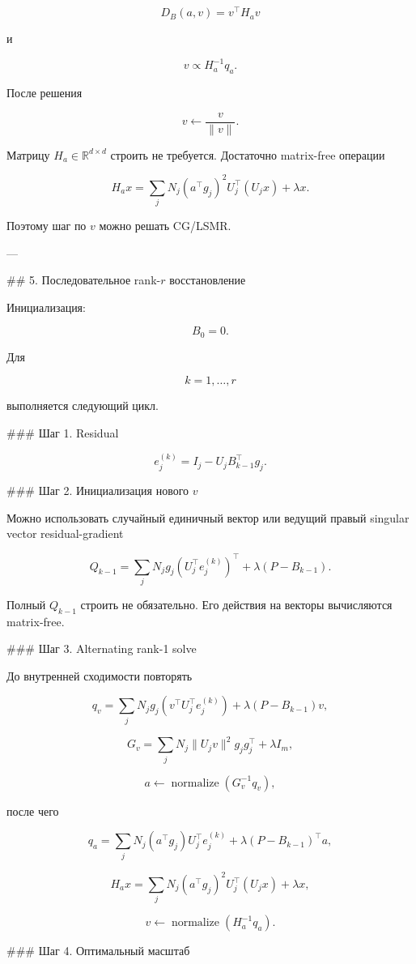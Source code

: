 \[
D_B(a,v)=v^\top H_av
\]

и

\[
\boxed{
v
\propto
H_a^{-1}q_a.
}
\]

После решения

\[
v\leftarrow\frac{v}{\|v\|}.
\]

Матрицу \(H_a\in\mathbb R^{d\times d}\) строить не требуется. Достаточно matrix-free операции

\[
H_ax
=
\sum_j
N_j
(a^\top g_j)^2
U_j^\top(U_jx)
+
\lambda x.
\]

Поэтому шаг по \(v\) можно решать CG/LSMR.

---

## 5. Последовательное rank-\(r\) восстановление

Инициализация:

\[
B_0=0.
\]

Для

\[
k=1,\ldots,r
\]

выполняется следующий цикл.

### Шаг 1. Residual

\[
e_j^{(k)}
=
I_j-U_jB_{k-1}^\top g_j.
\]

### Шаг 2. Инициализация нового \(v\)

Можно использовать случайный единичный вектор или ведущий правый singular vector residual-gradient

\[
Q_{k-1}
=
\sum_j
N_j
g_j
\left(U_j^\top e_j^{(k)}\right)^\top
+
\lambda(P-B_{k-1}).
\]

Полный \(Q_{k-1}\) строить не обязательно. Его действия на векторы вычисляются matrix-free.

### Шаг 3. Alternating rank-1 solve

До внутренней сходимости повторять

\[
q_v
=
\sum_j
N_jg_j
(v^\top U_j^\top e_j^{(k)})
+
\lambda(P-B_{k-1})v,
\]

\[
G_v
=
\sum_j
N_j
\|U_jv\|^2g_jg_j^\top
+
\lambda I_m,
\]

\[
a
\leftarrow
\operatorname{normalize}
\left(G_v^{-1}q_v\right),
\]

после чего

\[
q_a
=
\sum_j
N_j
(a^\top g_j)
U_j^\top e_j^{(k)}
+
\lambda(P-B_{k-1})^\top a,
\]

\[
H_a x
=
\sum_j
N_j
(a^\top g_j)^2
U_j^\top(U_jx)
+
\lambda x,
\]

\[
v
\leftarrow
\operatorname{normalize}
\left(H_a^{-1}q_a\right).
\]

### Шаг 4. Оптимальный масштаб

